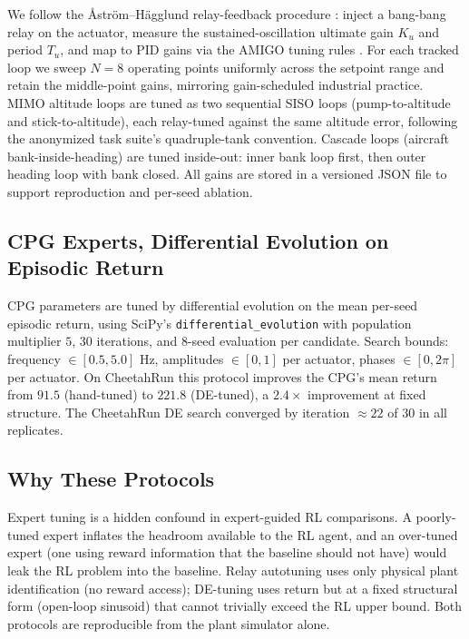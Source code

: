 \documentclass{article}
\begin{document}
We follow the Åström--Hägglund relay-feedback procedure
\citep{astrom1984relay}: inject a bang-bang relay on the actuator, measure
the sustained-oscillation ultimate gain $K_u$ and period $T_u$, and map to
PID gains via the AMIGO tuning rules \citep{astrom2005amigo}. For each
tracked loop we sweep $N=8$ operating points uniformly across the setpoint
range and retain the middle-point gains, mirroring gain-scheduled industrial
practice. MIMO altitude loops are tuned as two sequential SISO loops
(pump-to-altitude and stick-to-altitude), each relay-tuned against the same
altitude error, following the anonymized task suite's quadruple-tank
convention. Cascade loops (aircraft bank-inside-heading) are tuned
inside-out: inner bank loop first, then outer heading loop with bank closed.
All gains are stored in a versioned JSON file to support reproduction and
per-seed ablation.

\subsection{CPG Experts, Differential Evolution on Episodic Return}

CPG parameters are tuned by differential evolution \citep{storn1997de} on
the mean per-seed episodic return, using SciPy's \citep{virtanen2020scipy}
\texttt{differential\_evolution} with population multiplier $5$, $30$
iterations, and 8-seed evaluation per candidate. Search bounds: frequency
$\in [0.5, 5.0]$ Hz, amplitudes $\in [0, 1]$ per actuator, phases $\in
[0, 2\pi]$ per actuator. On CheetahRun this protocol improves the CPG's mean
return from $91.5$ (hand-tuned) to $221.8$ (DE-tuned), a $2.4\times$
improvement at fixed structure. The CheetahRun DE search converged by
iteration $\approx 22$ of 30 in all replicates.

\subsection{Why These Protocols}

Expert tuning is a hidden confound in expert-guided RL comparisons. A
poorly-tuned expert inflates the headroom available to the RL agent, and
an over-tuned expert (one using reward information that the baseline should
not have) would leak the RL problem into the baseline. Relay autotuning
uses only physical plant identification (no reward access); DE-tuning uses
return but at a fixed structural form (open-loop sinusoid) that cannot
trivially exceed the RL upper bound. Both protocols are reproducible from
the plant simulator alone.
\end{document}
